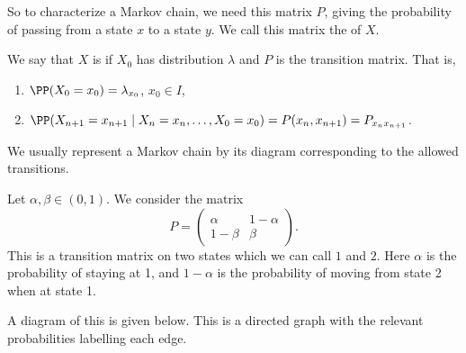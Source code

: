 \documentclass[a4paper]{scrartcl}
\begin{document}
So to characterize a Markov chain, we need this matrix $P$, giving the probability of passing from a state $x$ to a state $y$. We call this matrix the  of $X$.

\begin{definition}[Markov]
	We say that $X$ is  if $X_0$ has distribution $\lambda$ and $P$ is the transition matrix. That is,
	\begin{enumerate}[label=(\roman*)]
		\item $\PP(X_0 = x_0) = \lambda_{x_0}$, $x_0 \in I$,
		\item $\PP(X_{n + 1} = x_{n + 1} \mid X_n = x_n, \dots, X_0 = x_0) = P(x_n, x_{n + 1}) = P_{x_n x_{n + 1}}$.
	\end{enumerate}
\end{definition}

We usually represent a Markov chain by its diagram corresponding to the allowed transitions. 

\begin{example}
	Let $\alpha, \beta \in (0, 1)$. We consider the matrix
	$$
	P = \begin{pmatrix}
		\alpha & 1 - \alpha \\
		1 - \beta & \beta
	\end{pmatrix}.
	$$
	This is a transition matrix on two states which we can call $1$ and $2$. Here $\alpha$ is the probability of staying at 1, and $1 - \alpha$ is the probability of moving from state 2 when at state 1.

	A diagram of this is given below. This is a directed graph with the relevant probabilities labelling each edge.

	\begin{center}
	\end{center}
\end{example}
\end{document}
